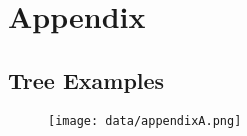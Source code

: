\section{Appendix}
\subsection{Tree Examples}

\begin{figure}[htb!]
  \centering
  \texttt{[image: data/appendixA.png]}
\end{figure}